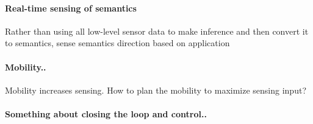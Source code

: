 \documentclass[10pt]{article}
\begin{document}




\paragraph{Real-time sensing of semantics}
Rather than using all low-level sensor data to make inference and then convert it to semantics, sense semantics direction based on application
\paragraph{Mobility..}
Mobility increases sensing. How to plan the mobility to maximize sensing input?
\paragraph{Something about closing the loop and control..}
\end{document}
